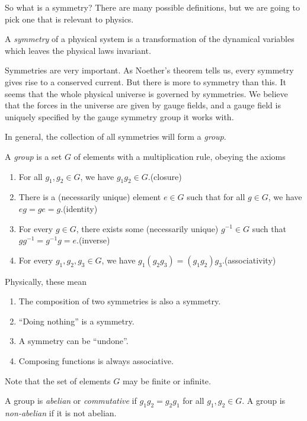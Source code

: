 \documentclass[a4paper]{article}
\begin{document}
So what is a symmetry? There are many possible definitions, but we are going to pick one that is relevant to physics.
\begin{defi}[Symmetry]
  A \emph{symmetry} of a physical system is a transformation of the dynamical variables which leaves the physical laws invariant.
\end{defi}
Symmetries are very important. As Noether's theorem tells us, every symmetry gives rise to a conserved current. But there is more to symmetry than this. It seems that the whole physical universe is governed by symmetries. We believe that the forces in the universe are given by gauge fields, and a gauge field is uniquely specified by the gauge symmetry group it works with.

In general, the collection of all symmetries will form a \emph{group}.
\begin{defi}[Group]
  A \emph{group} is a set $G$ of elements with a multiplication rule, obeying the axioms
  \begin{enumerate}
    \item For all $g_1, g_2 \in G$, we have $g_1 g_2 \in G$.\hfill (closure)
    \item There is a (necessarily unique) element $e \in G$ such that for all $g \in G$, we have $eg = ge = g$.\hfill (identity)
    \item For every $g \in G$, there exists some (necessarily unique) $g^{-1} \in G$ such that $gg^{-1} = g^{-1}g = e$.\hfill (inverse)
    \item For every $g_1, g_2, g_3 \in G$, we have $g_1 (g_2 g_3) = (g_1 g_2) g_3$.\hfill (associativity)
  \end{enumerate}
\end{defi}
Physically, these mean
\begin{enumerate}
  \item The composition of two symmetries is also a symmetry.
  \item ``Doing nothing'' is a symmetry.
  \item A symmetry can be ``undone''.
  \item Composing functions is always associative.
\end{enumerate}

Note that the set of elements $G$ may be finite or infinite.
\begin{defi}
  A group is \emph{abelian} or \emph{commutative} if $g_1 g_2 = g_2 g_1$ for all $g_1, g_2 \in G$. A group is \emph{non-abelian} if it is not abelian.
\end{defi}
\end{document}
